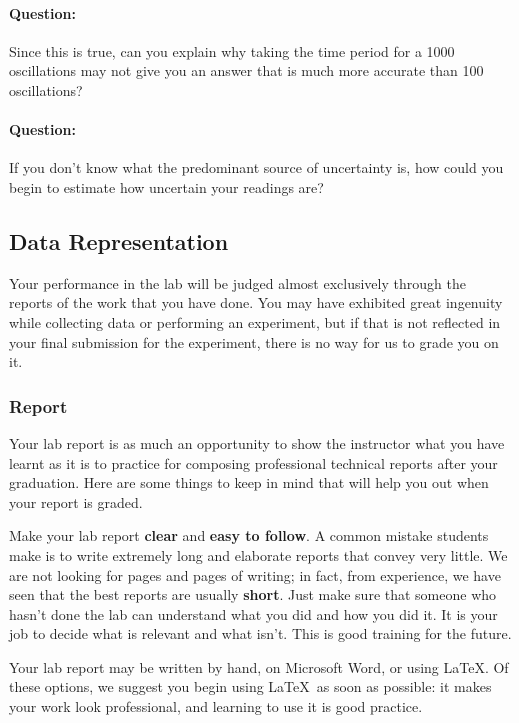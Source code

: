 \begin{question}
\paragraph{Question:} Since this is true, can you explain why taking the time period for a 1000 oscillations may not give you an answer that is much more accurate than 100 oscillations? ~\\

\paragraph{Question:} If you don't know what the predominant source of uncertainty is, how could you begin to estimate how uncertain your readings are?
\end{question}

\subsection{Data Representation}

Your performance in the lab will be judged almost exclusively through the reports of the work that you have done. You may have exhibited great ingenuity while collecting data or performing an experiment, but if that is not reflected in your final submission for the experiment, there is no way for us to grade you on it.

\subsubsection{Report}

Your lab report is as much an opportunity to show the instructor what you have learnt as it is to practice for composing professional technical reports after your graduation. Here are some things to keep in mind that will help you out when your report is graded.

Make your lab report \textbf{clear} and \textbf{easy to follow}. A common mistake students make is to write extremely long and elaborate reports that convey very little. We are not looking for pages and pages of writing; in fact, from experience, we have seen that the best reports are usually \textbf{short}. Just make sure that someone who hasn't done the lab can understand what you did and how you did it. It is your job to decide what is relevant and what isn't. This is good training for the future. 

\begin{imp}
Your lab report may be written by hand, on Microsoft Word, or using \LaTeX. Of these options, we suggest you begin using \LaTeX\, as soon as possible: it makes your work look professional, and learning to use it is good practice.
\end{imp}

